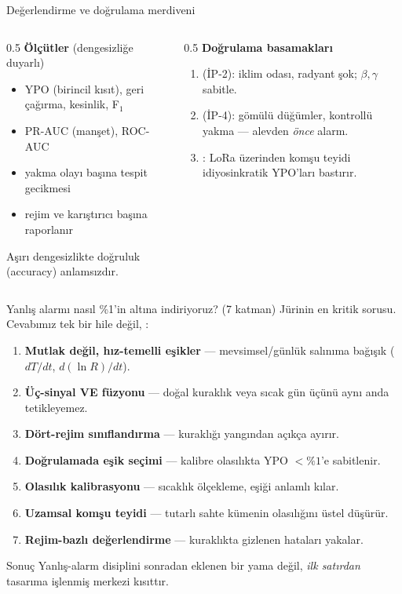 \documentclass[aspectratio=169,11pt]{beamer}
\newcommand{\src}[1]{{\scriptsize\color{aegisLeaf}#1}}
\begin{document}
\begin{frame}{Değerlendirme ve doğrulama merdiveni}
  \begin{columns}[T]
    \begin{column}{0.5\textwidth}
      \textbf{Ölçütler} (dengesizliğe duyarlı)
      \begin{itemize}\small
        \item YPO (birincil kısıt), geri çağırma, kesinlik, F$_1$
        \item PR-AUC (manşet), ROC-AUC
        \item yakma olayı başına tespit gecikmesi
        \item \alert{rejim ve karıştırıcı başına raporlanır}
      \end{itemize}
      \src{Aşırı dengesizlikte doğruluk (accuracy) anlamsızdır.}
    \end{column}
    \begin{column}{0.5\textwidth}
      \textbf{Doğrulama basamakları}
      \begin{enumerate}\small
        \item {} (İP-2): iklim odası, radyant şok; $\beta,\gamma$ sabitle.
        \item {} (İP-4): gömülü düğümler, kontrollü yakma — alevden \emph{önce} alarm.
        \item {}: LoRa üzerinden komşu teyidi idiyosinkratik YPO'ları bastırır.
      \end{enumerate}
    \end{column}
  \end{columns}
\end{frame}

\begin{frame}{Yanlış alarmı nasıl \%1'in altına indiriyoruz? (7 katman)}
  \small
  Jürinin en kritik sorusu. Cevabımız tek bir hile değil, :
  \begin{enumerate}\small
    \item \textbf{Mutlak değil, hız-temelli eşikler} — mevsimsel/günlük salınıma bağışık ($dT/dt$, $d(\ln R)/dt$).
    \item \textbf{Üç-sinyal VE füzyonu} — doğal kuraklık veya sıcak gün üçünü aynı anda tetikleyemez.
    \item \textbf{Dört-rejim sınıflandırma} — kuraklığı yangından açıkça ayırır.
    \item \textbf{Doğrulamada eşik seçimi} — kalibre olasılıkta YPO $<\%1$'e sabitlenir.
    \item \textbf{Olasılık kalibrasyonu} — sıcaklık ölçekleme, eşiği anlamlı kılar.
    \item \textbf{Uzamsal komşu teyidi} — tutarlı sahte kümenin olasılığını üstel düşürür.
    \item \textbf{Rejim-bazlı değerlendirme} — kuraklıkta gizlenen hataları yakalar.
  \end{enumerate}
  \begin{block}{Sonuç}
    Yanlış-alarm disiplini sonradan eklenen bir yama değil, \emph{ilk satırdan}
    tasarıma işlenmiş merkezi kısıttır.
  \end{block}
\end{frame}
\end{document}
